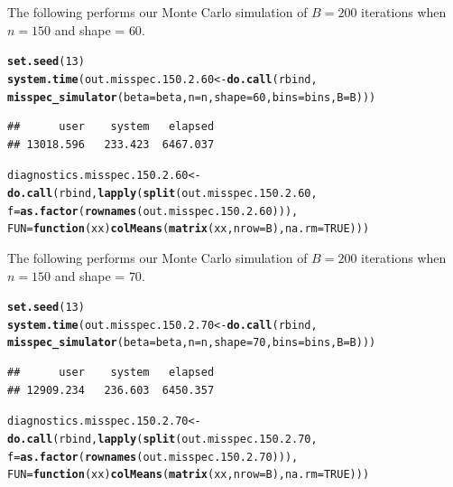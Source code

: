\documentclass[11pt]{article}\usepackage[]{graphicx}\usepackage[]{color}
\makeatletter
\newcommand{\hlnum}[1]{\textcolor[rgb]{0.686,0.059,0.569}{#1}}%
\newcommand{\hlstd}[1]{\textcolor[rgb]{0.345,0.345,0.345}{#1}}%
\newcommand{\hlkwa}[1]{\textcolor[rgb]{0.161,0.373,0.58}{\textbf{#1}}}%
\newcommand{\hlkwb}[1]{\textcolor[rgb]{0.69,0.353,0.396}{#1}}%
\newcommand{\hlkwc}[1]{\textcolor[rgb]{0.333,0.667,0.333}{#1}}%
\newcommand{\hlkwd}[1]{\textcolor[rgb]{0.737,0.353,0.396}{\textbf{#1}}}%
\newenvironment{kframe}{%
 \def\at@end@of@kframe{}%
 \ifinner\ifhmode%
  \def\at@end@of@kframe{\end{minipage}}%
  \begin{minipage}{\columnwidth}%
 \fi\fi%
 \def\FrameCommand##1{\hskip\@totalleftmargin \hskip-\fboxsep
 \colorbox{shadecolor}{##1}\hskip-\fboxsep
     \hskip-\linewidth \hskip-\@totalleftmargin \hskip\columnwidth}%
 \MakeFramed {\advance\hsize-\width
   \@totalleftmargin\z@ \linewidth\hsize
   \@setminipage}}%
 {\par\unskip\endMakeFramed%
 \at@end@of@kframe}
\newenvironment{knitrout}{}{} %
\makeatother
\begin{document}
The following performs our Monte Carlo simulation of $B = 200$ iterations 
when $n = 150$ and shape = $60$.

\begin{knitrout}
\color{fgcolor}\begin{kframe}
\begin{alltt}
\hlkwd{set.seed}\hlstd{(}\hlnum{13}\hlstd{)}
\hlkwd{system.time}\hlstd{(out.misspec.150.2.60} \hlkwb{<-} \hlkwd{do.call}\hlstd{(rbind,}
  \hlkwd{misspec_simulator}\hlstd{(}\hlkwc{beta} \hlstd{= beta,} \hlkwc{n} \hlstd{= n,} \hlkwc{shape} \hlstd{=} \hlnum{60}\hlstd{,} \hlkwc{bins} \hlstd{= bins,} \hlkwc{B} \hlstd{= B)))}
\end{alltt}
\begin{verbatim}
##      user    system   elapsed 
## 13018.596   233.423  6467.037
\end{verbatim}
\begin{alltt}
\hlstd{diagnostics.misspec.150.2.60} \hlkwb{<-} \hlkwd{do.call}\hlstd{(rbind,} \hlkwd{lapply}\hlstd{(}\hlkwd{split}\hlstd{(out.misspec.150.2.60,}
  \hlkwc{f} \hlstd{=} \hlkwd{as.factor}\hlstd{(}\hlkwd{rownames}\hlstd{(out.misspec.150.2.60))),}
  \hlkwc{FUN} \hlstd{=} \hlkwa{function}\hlstd{(}\hlkwc{xx}\hlstd{)} \hlkwd{colMeans}\hlstd{(}\hlkwd{matrix}\hlstd{(xx,} \hlkwc{nrow} \hlstd{= B),} \hlkwc{na.rm} \hlstd{=} \hlnum{TRUE}\hlstd{)))}
\end{alltt}
\end{kframe}
\end{knitrout}


The following performs our Monte Carlo simulation of $B = 200$ iterations 
when $n = 150$ and shape = $70$.

\begin{knitrout}
\color{fgcolor}\begin{kframe}
\begin{alltt}
\hlkwd{set.seed}\hlstd{(}\hlnum{13}\hlstd{)}
\hlkwd{system.time}\hlstd{(out.misspec.150.2.70} \hlkwb{<-} \hlkwd{do.call}\hlstd{(rbind,}
  \hlkwd{misspec_simulator}\hlstd{(}\hlkwc{beta} \hlstd{= beta,} \hlkwc{n} \hlstd{= n,} \hlkwc{shape} \hlstd{=} \hlnum{70}\hlstd{,} \hlkwc{bins} \hlstd{= bins,} \hlkwc{B} \hlstd{= B)))}
\end{alltt}
\begin{verbatim}
##      user    system   elapsed 
## 12909.234   236.603  6450.357
\end{verbatim}
\begin{alltt}
\hlstd{diagnostics.misspec.150.2.70} \hlkwb{<-} \hlkwd{do.call}\hlstd{(rbind,} \hlkwd{lapply}\hlstd{(}\hlkwd{split}\hlstd{(out.misspec.150.2.70,}
  \hlkwc{f} \hlstd{=} \hlkwd{as.factor}\hlstd{(}\hlkwd{rownames}\hlstd{(out.misspec.150.2.70))),}
  \hlkwc{FUN} \hlstd{=} \hlkwa{function}\hlstd{(}\hlkwc{xx}\hlstd{)} \hlkwd{colMeans}\hlstd{(}\hlkwd{matrix}\hlstd{(xx,} \hlkwc{nrow} \hlstd{= B),} \hlkwc{na.rm} \hlstd{=} \hlnum{TRUE}\hlstd{)))}
\end{alltt}
\end{kframe}
\end{knitrout}
\end{document}
